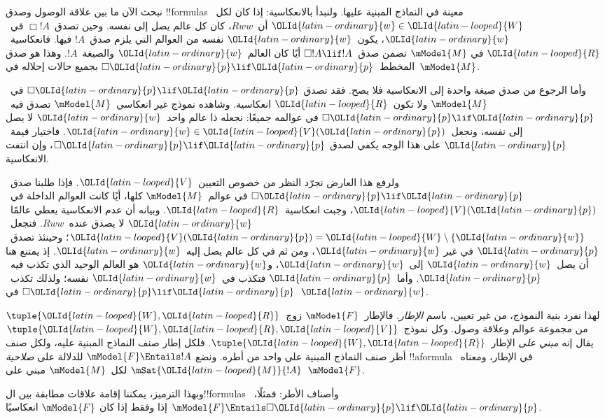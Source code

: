 \documentclass[../../../include/open-logic-section]{subfiles}
\begin{document}


نبحث الآن ما بين علاقة الوصول وصدق !!{formula}s معينة في النماذج
المبنية عليها. ولنبدأ بالانعكاسية: إذا كان لكل~$\OLId{latin-ordinary}{w} \in \OLId{latin-looped}{W}$ أن~$Rww$،
كان كل عالم يصل إلى نفسه. وحين تصدق~$\Box !A$ في~$\OLId{latin-ordinary}{w}$، يكون~$\OLId{latin-ordinary}{w}$
نفسه من العوالم التي يلزم صدق~$!A$ فيها. فانعكاسية~$\OLId{latin-looped}{R}$ في
$\mModel{M}$ تضمن صدق~$\Box !A \lif !A$ أيًا كان العالم~$\OLId{latin-ordinary}{w}$
والصيغة~$!A$. وهذا هو صدق المخطط~$\Box \OLId{latin-ordinary}{p} \lif \OLId{latin-ordinary}{p}$ بجميع حالات
إحلاله في~$\mModel{M}$.

وأما الرجوع من صدق صيغة واحدة إلى الانعكاسية فلا يصح. فقد تصدق
$\Box \OLId{latin-ordinary}{p} \lif \OLId{latin-ordinary}{p}$ في~$\mModel{M}$ ولا تكون~$\OLId{latin-looped}{R}$ انعكاسية.
وشاهده نموذج غير انعكاسي~$\mModel{M}$ تصدق فيه~$\Box \OLId{latin-ordinary}{p} \lif \OLId{latin-ordinary}{p}$
في عوالمه جميعًا: نجعله ذا عالم واحد~$\OLId{latin-ordinary}{w}$ لا يصل إلى نفسه،
ونجعل~$\OLId{latin-ordinary}{w} \in \OLId{latin-looped}{V}(\OLId{latin-ordinary}{p})$. فاختيار قيمة~$\OLId{latin-ordinary}{p}$ على هذا الوجه يكفي لصدق
$\Box \OLId{latin-ordinary}{p} \lif \OLId{latin-ordinary}{p}$، وإن انتفت الانعكاسية.

ولرفع هذا العارض نجرّد النظر من خصوص التعيين~$\OLId{latin-looped}{V}$.
فإذا طلبنا صدق~$\Box \OLId{latin-ordinary}{p} \lif \OLId{latin-ordinary}{p}$ في عوالم~$\mModel{M}$ كلها،
أيًا كانت العوالم الداخلة في~$\OLId{latin-looped}{V}(\OLId{latin-ordinary}{p})$، وجبت انعكاسية~$\OLId{latin-looped}{R}$.
وبيانه أن عدم الانعكاسية يعطي عالمًا~$\OLId{latin-ordinary}{w}$ لا يصدق عنده~$Rww$.
فنجعل~$\OLId{latin-looped}{V}(\OLId{latin-ordinary}{p}) = \OLId{latin-looped}{W} \setminus \{\OLId{latin-ordinary}{w}\}$؛ وحينئذ تصدق~$\OLId{latin-ordinary}{p}$ في غير
$\OLId{latin-ordinary}{w}$، ومن ثم في كل عالم يصل إليه~$\OLId{latin-ordinary}{w}$. إذ يمتنع هنا أن يصل~$\OLId{latin-ordinary}{w}$
إلى~$\OLId{latin-ordinary}{w}$، و$\OLId{latin-ordinary}{w}$ هو العالم الوحيد الذي تكذب فيه~$\OLId{latin-ordinary}{p}$.
وأما~$\OLId{latin-ordinary}{p}$ فتكذب في~$\OLId{latin-ordinary}{w}$ نفسه؛ ولذلك تكذب~$\Box \OLId{latin-ordinary}{p} \lif \OLId{latin-ordinary}{p}$ في~$\OLId{latin-ordinary}{w}$.

لهذا نفرد بنية النموذج، من غير تعيين، باسم \emph{الإطار}.
فالإطار~$\mModel{F}$ زوج~$\tuple{\OLId{latin-looped}{W}, \OLId{latin-looped}{R}}$ من مجموعة عوالم وعلاقة
وصول. وكل نموذج~$\tuple{\OLId{latin-looped}{W}, \OLId{latin-looped}{R}, \OLId{latin-looped}{V}}$ يقال إنه \emph{مبني على}
الإطار~$\tuple{\OLId{latin-looped}{W}, \OLId{latin-looped}{R}}$. فلكل إطار صنف النماذج المبنية عليه،
ولكل صنف أطر صنف النماذج المبنية على واحد من أطره. ونضع
$\mModel{F} \Entails !A$ للدلالة على \emph{صلاحية} !!a{formula}
في الإطار، ومعناه~$\mSat{\OLId{latin-looped}{M}}{!A}$ لكل~$\mModel{M}$ مبني
على~$\mModel{F}$.

وبهذا الترميز، يمكننا إقامة علاقات مطابقة بين ال!!{formula}s وأصناف
الأطر: فمثلًا،~$\mModel{F} \Entails \Box \OLId{latin-ordinary}{p} \lif \OLId{latin-ordinary}{p}$ إذا وفقط إذا كان
$\mModel{F}$ انعكاسيًا.
\end{document}
